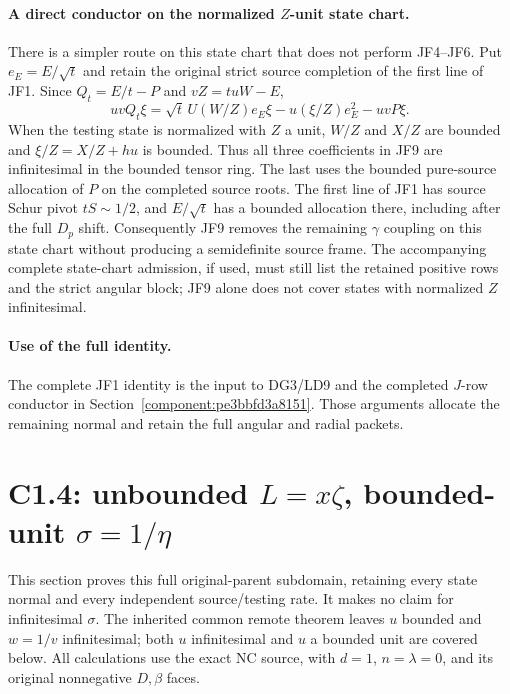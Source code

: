 \paragraph{A direct conductor on the normalized $Z$-unit state chart.}
There is a simpler route on this state chart that does not perform JF4--JF6.
Put $e_E=E/\sqrt t$ and retain the original strict source completion
of the first line of JF1. Since $Q_t=E/t-P$ and $vZ=tuW-E$,
\[
 uvQ_t\xi=\sqrt t\,U(W/Z)e_E\xi
             -u(\xi/Z)e_E^2-uvP\xi.                \tag{JF9}
\]
When the testing state is normalized with $Z$ a unit, $W/Z$ and
$X/Z$ are bounded and $\xi/Z=X/Z+hu$ is bounded. Thus all three
coefficients in JF9 are infinitesimal in the bounded tensor ring.
The last uses the bounded pure-source allocation of $P$ on the
completed source roots. The first line of JF1 has source Schur pivot
$tS\sim1/2$, and $E/\sqrt t$ has a bounded allocation there,
including after the full $D_p$ shift. Consequently JF9 removes the
remaining $\gamma$ coupling on this state chart without producing
a semidefinite source frame.
The accompanying complete state-chart admission, if used, must still
list the retained positive rows and the strict angular block; JF9
alone does not cover states with normalized $Z$ infinitesimal.

\paragraph{Use of the full identity.}
The complete JF1 identity is the input to DG3/LD9 and the completed $J$-row conductor in Section~\ref{component:pe3bbfd3a8151}. Those arguments allocate the remaining normal and retain the full angular and radial packets.


\section{\texorpdfstring{C1.4: unbounded $L=x\zeta$, bounded-unit $\sigma=1/\eta$}{C1.4: unbounded L=xzeta, bounded-unit sigma=1/eta}}
\label{component:pd4b92bf7de71}

\label{pd4b92bf7de71:sec:c14-large-l-unit}
This section proves this full original-parent subdomain, retaining every
state normal and every independent source/testing rate. It makes no claim
for infinitesimal $\sigma$. The inherited common remote theorem leaves
$u$ bounded and $w=1/v$ infinitesimal; both $u$ infinitesimal and $u$ a
bounded unit are covered below. All calculations use the exact NC source,
with $d=1$, $n=\lambda=0$, and its original nonnegative $D,\beta$ faces.


